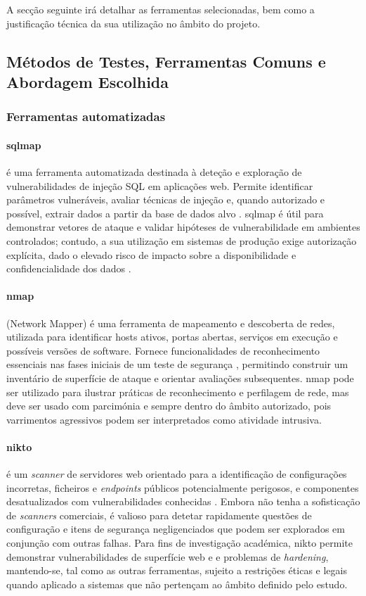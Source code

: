 A secção seguinte irá detalhar as ferramentas selecionadas, bem como a justificação técnica da sua utilização no âmbito do projeto.


\subsection{Métodos de Testes, Ferramentas Comuns e Abordagem Escolhida}

\subsubsection{Ferramentas automatizadas}

\paragraph{sqlmap}

é uma ferramenta automatizada
destinada à deteção e exploração de vulnerabilidades de injeção SQL em aplicações web.
Permite identificar parâmetros vulneráveis, avaliar técnicas de injeção
e, quando autorizado e possível, extrair dados a partir da base de dados alvo \cite{ref2}.
sqlmap é útil para demonstrar vetores de ataque e validar hipóteses de vulnerabilidade
em ambientes controlados; contudo, a sua utilização em sistemas de produção exige autorização explícita,
dado o elevado risco de impacto sobre a disponibilidade e confidencialidade dos dados \cite{ref3}.

\paragraph{nmap}
(Network Mapper) é uma ferramenta de mapeamento e descoberta de redes,
utilizada para identificar hosts ativos, portas abertas, serviços em execução e possíveis versões de software.
Fornece funcionalidades de reconhecimento essenciais nas fases iniciais de um teste de segurança \cite{ref1},
permitindo construir um inventário de superfície de ataque e orientar avaliações subsequentes.
nmap pode ser utilizado para ilustrar práticas de reconhecimento e perfilagem de rede,
mas deve ser usado com parcimónia e sempre dentro do âmbito autorizado,
pois varrimentos agressivos podem ser interpretados como atividade intrusiva.

\paragraph{nikto}

é um \textit{scanner} de servidores web orientado para a identificação de configurações incorretas,
ficheiros e \textit{endpoints} públicos potencialmente perigosos,
e componentes desatualizados com vulnerabilidades conhecidas \cite{ref21}.
Embora não tenha a sofisticação de \textit{scanners} comerciais,
é valioso para detetar rapidamente questões de configuração e itens de segurança negligenciados
que podem ser explorados em conjunção com outras falhas.
Para fins de investigação académica, nikto permite demonstrar vulnerabilidades de superfície web
e e problemas de \textit{hardening}, mantendo-se, tal como as outras ferramentas,
sujeito a restrições éticas e legais quando aplicado a sistemas
que não pertençam ao âmbito definido pelo estudo.


